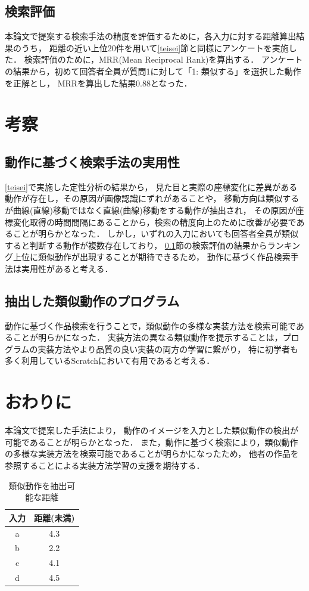 \documentclass[twocolumn]{jarticle} %
\begin{document}
\subsection{検索評価}
\label{ranking}
本論文で提案する検索手法の精度を評価するために，各入力に対する距離算出結果のうち，
距離の近い上位20件を用いて\ref{teisei}節と同様にアンケートを実施した．
検索評価のために，MRR(Mean Reciprocal Rank)を算出する．
アンケートの結果から，初めて回答者全員が質問1に対して「1: 類似する」を選択した動作を正解とし，
MRRを算出した結果0.88となった．

\section{考察}
\subsection{動作に基づく検索手法の実用性}
\ref{teisei}で実施した定性分析の結果から，
見た目と実際の座標変化に差異がある動作が存在し，その原因が画像認識にずれがあることや，
移動方向は類似するが曲線(直線)移動ではなく直線(曲線)移動をする動作が抽出され，
その原因が座標変化取得の時間間隔にあることから，検索の精度向上のために改善が必要であることが明らかとなった．
しかし，いずれの入力においても回答者全員が類似すると判断する動作が複数存在しており，
\ref{ranking}節の検索評価の結果からランキング上位に類似動作が出現することが期待できるため，
動作に基づく作品検索手法は実用性があると考える．

\subsection{抽出した類似動作のプログラム}
動作に基づく作品検索を行うことで，類似動作の多様な実装方法を検索可能であることが明らかになった．
実装方法の異なる類似動作を提示することは，プログラムの実装方法やより品質の良い実装の両方の学習に繋がり，
特に初学者も多く利用しているScratchにおいて有用であると考える．

\section{おわりに}
本論文で提案した手法により，
動作のイメージを入力とした類似動作の検出が可能であることが明らかとなった．
また，動作に基づく検索により，類似動作の多様な実装方法を検索可能であることが明らかになったため，
他者の作品を参照することによる実装方法学習の支援を期待する．

\begin{table}
    \caption{類似動作を抽出可能な距離}
    \label{result}
    \centering
    \begin{tabular}{c|c}
    \hline
    入力 & 距離(未満) \\
    \hline \hline
    a & 4.3 \\
    \hline
    b & 2.2 \\
    \hline
    c & 4.1 \\
    \hline
    d & 4.5 \\
    \hline
    \end{tabular}
\end{table}
\end{document}
